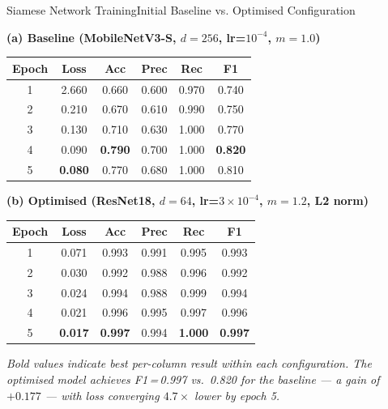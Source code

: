 \documentclass[10pt]{beamer}
\begin{document}
	
	
	
	\begin{frame}{Siamese Network Training}{Initial Baseline vs. Optimised Configuration}
    \begin{table}[h]
        \centering
        \label{tab:siamese_comparison}
        \setlength{\tabcolsep}{6pt}
        
        \textbf{(a) Baseline (MobileNetV3-S, $d=256$, lr=$10^{-4}$, $m=1.0$)}
        \vspace{0.15cm}
        
        \begin{tabular}{cccccc}
        \toprule
        Epoch & Loss & Acc & Prec & Rec & F1 \\
        \midrule
        1 & 2.660 & 0.660 & 0.600 & 0.970 & 0.740 \\
        2 & 0.210 & 0.670 & 0.610 & 0.990 & 0.750 \\
        3 & 0.130 & 0.710 & 0.630 & 1.000 & 0.770 \\
        4 & 0.090 & \textbf{0.790} & 0.700 & 1.000 & \textbf{0.820} \\
        5 & \textbf{0.080} & 0.770 & 0.680 & 1.000 & 0.810 \\
        \bottomrule
        \end{tabular}
        
        \vspace{0.2cm}
        
        \textbf{(b) Optimised (ResNet18, $d=64$, lr=$3\times10^{-4}$, $m=1.2$, L2 norm)}
        \vspace{0.1cm}
        
        \begin{tabular}{cccccc}
        \toprule
        Epoch & Loss & Acc & Prec & Rec & F1 \\
        \midrule
        1 & 0.071 & 0.993 & 0.991 & 0.995 & 0.993 \\
        2 & 0.030 & 0.992 & 0.988 & 0.996 & 0.992 \\
        3 & 0.024 & 0.994 & 0.988 & 0.999 & 0.994 \\
        4 & 0.021 & 0.996 & 0.995 & 0.997 & 0.996 \\
        5 & \textbf{0.017} & \textbf{0.997} & 0.994 & \textbf{1.000} & \textbf{0.997} \\
        \bottomrule
        \end{tabular}
        
        \vspace{0.3cm}
        \raggedright
        \small\textit{Bold values indicate best per-column result within each configuration.
        The optimised model achieves F1\,=\,0.997 vs.\ 0.820 for the baseline --- a gain of
        $+0.177$ --- with loss converging $4.7\times$ lower by epoch 5.}
        
        \end{table}

    \end{frame}
\end{document}
